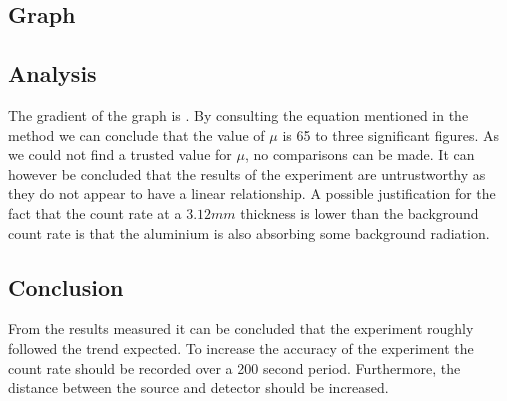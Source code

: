 \subsection{Graph}

\begin{figure}[H]
  \centering
\end{figure}

\subsection{Analysis}
The gradient of the graph is \regaD. By consulting the equation mentioned in the method we can conclude that the value of $\mu$ is 65 to three significant figures. As we could not find a trusted value for $\mu$, no comparisons can be made. It can however be concluded that the results of the experiment are untrustworthy as they do not appear to have a linear relationship. A possible justification for the fact that the count rate at a $3.12mm$ thickness is lower than the background count rate is that the aluminium is also absorbing some background radiation.


\subsection{Conclusion}
From the results measured it can be concluded that the experiment roughly followed the trend expected.
To increase the accuracy of the experiment the count rate should be recorded over a 200 second period.
Furthermore, the distance between the source and detector should be increased.
